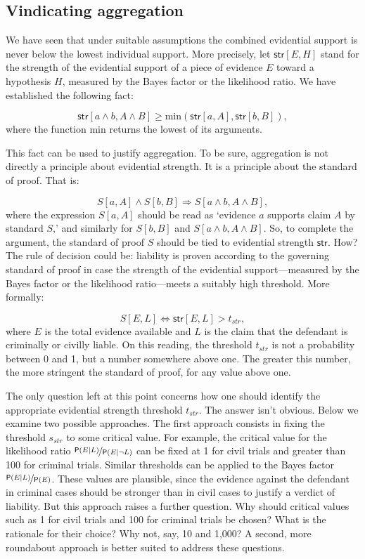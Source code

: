 \documentclass[
  10pt,
  dvipsnames,enabledeprecatedfontcommands]{scrartcl}
\newcommand{\pr}[1]{\ensuremath{\mathsf{P}(#1)}}
\begin{document}
\hypertarget{vindicating-aggregation}{%
\subsection{Vindicating aggregation}\label{vindicating-aggregation}}

We have seen that under suitable assumptions the combined evidential
support is never below the lowest individual support. More precisely,
let \(\mathsf{str}[E, H]\) stand for the strength of the evidential
support of a piece of evidence \(E\) toward a hypothesis \(H\), measured
by the Bayes factor or the likelihood ratio. We have established the
following fact:

\[\mathsf{str}[a \wedge b, A\wedge B] \geq \text{min}(\mathsf{str}[a, A], \mathsf{str}[b, B]),\]
where the function \(\text{min}\) returns the lowest of its arguments.

This fact can be used to justify aggregation. To be sure, aggregation is
not directly a principle about evidential strength. It is a principle
about the standard of proof. That is:

\[S[a, A] \wedge S[b, B] \Rightarrow  S[a \wedge b, A\wedge B],\] where
the expression \(S[a, A]\) should be read as `evidence \(a\) supports
claim \(A\) by standard \(S\),' and similarly for \(S[b, B]\) and
\(S[a \wedge b, A\wedge B]\). So, to complete the argument, the standard
of proof \(S\) should be tied to evidential strength \(\mathsf{str}\).
How? The rule of decision could be: liability is proven according to the
governing standard of proof in case the strength of the evidential
support---measured by the Bayes factor or the likelihood ratio---meets a
suitably high threshold. More formally:

\[S[E, L] \Leftrightarrow \mathsf{str}[E, L]>t_{str},\] where \(E\) is
the total evidence available and \(L\) is the claim that the defendant
is criminally or civilly liable. On this reading, the threshold
\(t_{str}\) is not a probability between 0 and 1, but a number somewhere
above one. The greater this number, the more stringent the standard of
proof, for any value above one.

The only question left at this point concerns how one should identify
the appropriate evidential strength threshold \(t_{str}\). The answer
isn't obvious. Below we examine two possible approaches. The first
approach consists in fixing the threshold \(s_{str}\) to some critical
value. For example, the critical value for the likelihood ratio
\(\nicefrac{\pr{E \vert L}}{\pr{E \vert \neg L}}\) can be fixed at 1 for
civil trials and greater than 100 for criminal trials. Similar
thresholds can be applied to the Bayes factor
\(\nicefrac{\pr{E \vert L}}{\pr{E}}\). These values are plausible, since
the evidence against the defendant in criminal cases should be stronger
than in civil cases to justify a verdict of liability. But this approach
raises a further question. Why should critical values such as 1 for
civil trials and 100 for criminal trials be chosen? What is the
rationale for their choice? Why not, say, 10 and 1,000? A second, more
roundabout approach is better suited to address these questions.
\end{document}

